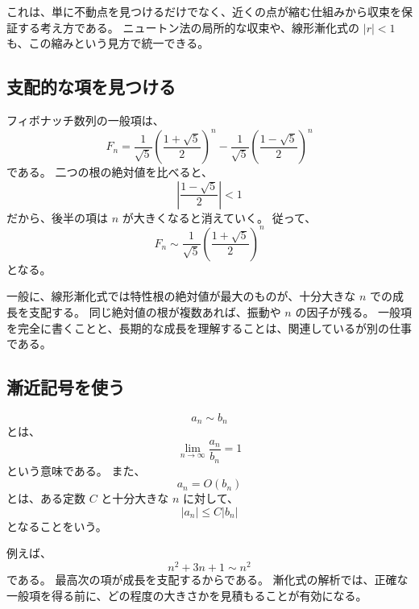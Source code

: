 これは、単に不動点を見つけるだけでなく、近くの点が縮む仕組みから収束を保証する考え方である。
ニュートン法の局所的な収束や、線形漸化式の $|r|<1$ も、この縮みという見方で統一できる。

\subsection{支配的な項を見つける}

フィボナッチ数列の一般項は、
\[
  F_n=\frac1{\sqrt5}\left(\frac{1+\sqrt5}{2}\right)^n
  -\frac1{\sqrt5}\left(\frac{1-\sqrt5}{2}\right)^n
\]
である。
二つの根の絶対値を比べると、
\[
  \left|\frac{1-\sqrt5}{2}\right|<1
\]
だから、後半の項は $n$ が大きくなると消えていく。
従って、
\[
  F_n\sim
  \frac1{\sqrt5}
  \left(\frac{1+\sqrt5}{2}\right)^n
\]
となる。

一般に、線形漸化式では特性根の絶対値が最大のものが、十分大きな $n$ での成長を支配する。
同じ絶対値の根が複数あれば、振動や $n$ の因子が残る。
一般項を完全に書くことと、長期的な成長を理解することは、関連しているが別の仕事である。

\subsection{漸近記号を使う}

\[
  a_n\sim b_n
\]
とは、
\[
  \lim_{n\to\infty}\frac{a_n}{b_n}=1
\]
という意味である。
また、
\[
  a_n=O(b_n)
\]
とは、ある定数 $C$ と十分大きな $n$ に対して、
\[
  |a_n|\leq C|b_n|
\]
となることをいう。

例えば、
\[
  n^2+3n+1\sim n^2
\]
である。
最高次の項が成長を支配するからである。
漸化式の解析では、正確な一般項を得る前に、どの程度の大きさかを見積もることが有効になる。
